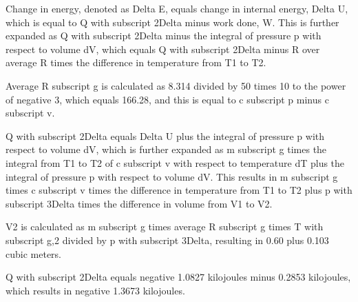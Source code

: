Change in energy, denoted as Delta E, equals change in internal energy, Delta U, which is equal to Q with subscript 2Delta minus work done, W. This is further expanded as Q with subscript 2Delta minus the integral of pressure p with respect to volume dV, which equals Q with subscript 2Delta minus R over average R times the difference in temperature from T1 to T2.

Average R subscript g is calculated as 8.314 divided by 50 times 10 to the power of negative 3, which equals 166.28, and this is equal to c subscript p minus c subscript v.

Q with subscript 2Delta equals Delta U plus the integral of pressure p with respect to volume dV, which is further expanded as m subscript g times the integral from T1 to T2 of c subscript v with respect to temperature dT plus the integral of pressure p with respect to volume dV. This results in m subscript g times c subscript v times the difference in temperature from T1 to T2 plus p with subscript 3Delta times the difference in volume from V1 to V2.

V2 is calculated as m subscript g times average R subscript g times T with subscript g,2 divided by p with subscript 3Delta, resulting in 0.60 plus 0.103 cubic meters.

Q with subscript 2Delta equals negative 1.0827 kilojoules minus 0.2853 kilojoules, which results in negative 1.3673 kilojoules.